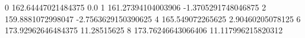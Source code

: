 0 162.64447021484375 0.0
1 161.27394104003906 -1.3705291748046875
2 159.8881072998047 -2.7563629150390625
4 165.549072265625 2.90460205078125
6 173.92962646484375 11.28515625
8 173.76246643066406 11.117996215820312
